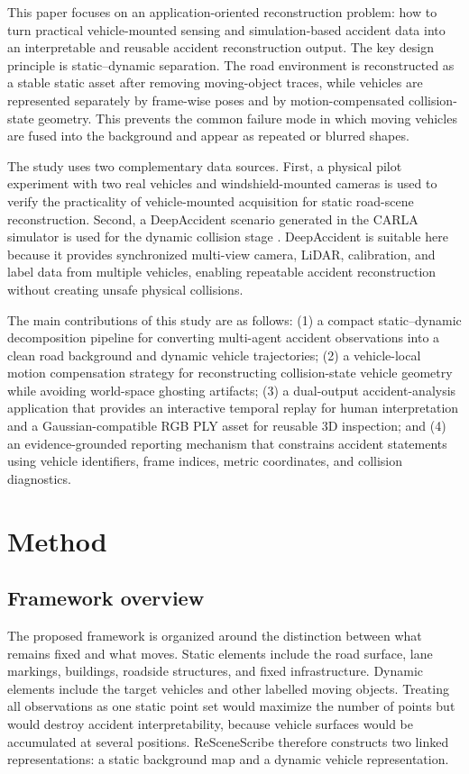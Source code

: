 \documentclass[conference]{IEEEtran}
\begin{document}
This paper focuses on an application-oriented reconstruction problem: how to
turn practical vehicle-mounted sensing and simulation-based accident data into
an interpretable and reusable accident reconstruction output. The key design
principle is static--dynamic separation. The road environment is reconstructed
as a stable static asset after removing moving-object traces, while vehicles
are represented separately by frame-wise poses and by motion-compensated
collision-state geometry. This prevents the common failure mode in which moving
vehicles are fused into the background and appear as repeated or blurred
shapes.

The study uses two complementary data sources. First, a physical pilot
experiment with two real vehicles and windshield-mounted cameras is used to
verify the practicality of vehicle-mounted acquisition for static road-scene
reconstruction. Second, a DeepAccident scenario generated in the CARLA simulator
is used for the dynamic collision stage \cite{dosovitskiy2017carla,wang2024deepaccident}.
DeepAccident is suitable here because it provides synchronized multi-view
camera, LiDAR, calibration, and label data from multiple vehicles, enabling
repeatable accident reconstruction without creating unsafe physical collisions.

The main contributions of this study are as follows: (1) a compact
static--dynamic decomposition pipeline for converting multi-agent accident
observations into a clean road background and dynamic vehicle trajectories; (2)
a vehicle-local motion compensation strategy for reconstructing
collision-state vehicle geometry while avoiding world-space ghosting artifacts;
(3) a dual-output accident-analysis application that provides an interactive
temporal replay for human interpretation and a Gaussian-compatible RGB PLY
asset for reusable 3D inspection; and (4) an evidence-grounded reporting
mechanism that constrains accident statements using vehicle identifiers, frame
indices, metric coordinates, and collision diagnostics.

\section{Method}

\subsection{Framework overview}

The proposed framework is organized around the distinction between what remains
fixed and what moves. Static elements include the road surface, lane markings,
buildings, roadside structures, and fixed infrastructure. Dynamic elements
include the target vehicles and other labelled moving objects. Treating all
observations as one static point set would maximize the number of points but
would destroy accident interpretability, because vehicle surfaces would be
accumulated at several positions. ReSceneScribe therefore constructs two linked
representations: a static background map and a dynamic vehicle representation.
\end{document}
